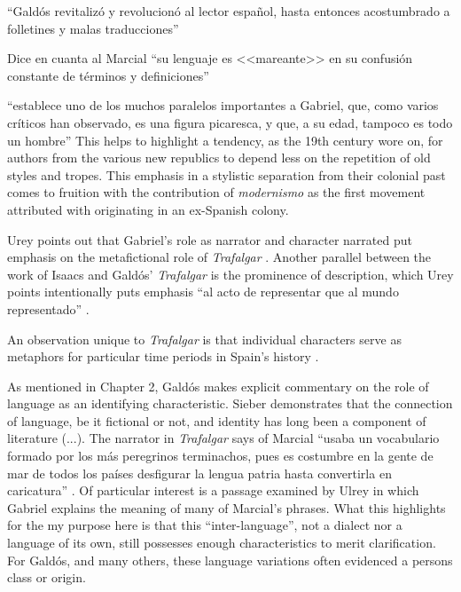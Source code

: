 \documentclass[12pt]{report}
\begin{document}
\enquote{Galdós revitalizó y revolucionó al lector español, hasta entonces acostumbrado a folletines y malas traducciones} \cite[1525]{Urey1992}

Dice en cuanta al Marcial \enquote{su lenguaje es <<mareante>> en su confusión constante de términos y definiciones} \cite[1526]{Urey1992}

\enquote{establece uno de los muchos paralelos importantes a Gabriel, que, como varios críticos han observado, es una figura picaresca, y que, a su edad, tampoco es todo un hombre} \cite[1526]{Urey1992}
This helps to highlight a tendency, as the 19th century wore on, for authors from the various new republics to depend less on the repetition of old styles and tropes.
This emphasis in a stylistic separation from their colonial past comes to fruition with the contribution of \textit{modernismo} as the first movement attributed with originating in an ex-Spanish colony.

Urey points out that Gabriel's role as narrator and character narrated put emphasis on the metafictional role of \textit{Trafalgar} \cite[1526]{Urey1992}.
Another parallel between the work of Isaacs and Galdós' \textit{Trafalgar} is the prominence of description, which Urey points intentionally puts emphasis \enquote{al acto de representar que al mundo representado} \cite[1527]{Urey1992}.


An observation unique to \textit{Trafalgar} is that individual characters serve as metaphors for particular time periods in Spain's history \cite[1527]{Urey1992}. 


As mentioned in Chapter 2, Galdós makes explicit commentary on the role of language as an identifying characteristic.
Sieber demonstrates that the connection of language, be it fictional or not, and identity has long been a component of literature \nocite{Sieber1978}(...).
The narrator in \textit{Trafalgar} says of Marcial \enquote{usaba un vocabulario formado por los más peregrinos terminachos, pues es costumbre en la gente de mar de todos los países desfigurar la lengua patria hasta convertirla en caricatura} \cite[21]{Galdós1882}.
Of particular interest is a passage examined by Ulrey in which Gabriel explains the meaning of many of Marcial's phrases.
What this highlights for the my purpose here is that this \enquote{inter-language}, not a dialect nor a language of its own, still possesses enough characteristics to merit clarification.
For Galdós, and many others, these language variations often evidenced a persons class or origin.
\end{document}
